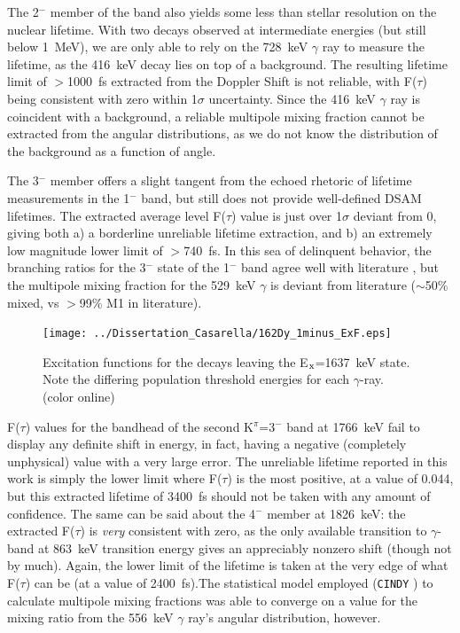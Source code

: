 The 2$^-$ member of the band also yields some less than stellar resolution on the nuclear lifetime. With two decays observed at intermediate energies (but still below 1~MeV), we are only able to rely on the 728~keV $\gamma$ ray to measure the lifetime, as the 416~keV decay lies on top of a background. The resulting lifetime limit of $>$1000~fs extracted from the Doppler Shift is not reliable, with F($\tau$) being consistent with zero within 1$\sigma$ uncertainty. Since the 416~keV $\gamma$ ray is coincident with a background, a reliable multipole mixing fraction cannot be extracted from the angular distributions, as we do not know the distribution of the background as a function of angle. 

The 3$^-$ member offers a slight tangent from the echoed rhetoric of lifetime measurements in the 1$^-$ band, but still does not provide well-defined DSAM lifetimes. The extracted average level F($\tau$) value is just over 1$\sigma$ deviant from 0, giving both a) a borderline unreliable lifetime extraction, and b) an extremely low magnitude lower limit of $>$740~fs. In this sea of delinquent behavior, the branching ratios for the 3$^-$ state of the 1$^-$ band agree well with literature \cite{Aprahamian200642}, but the multipole mixing fraction for the 529~keV $\gamma$ is deviant from literature ($\sim$50\% mixed, vs $>$99\% M1 in literature). %


\begin{figure}[h!]
\begin{center}
\texttt{[image: ../Dissertation\_Casarella/162Dy\_1minus\_ExF.eps]}
\end{center}
\caption{Excitation functions for the decays leaving the E$_{\rm x}$=1637~keV state. Note the differing population threshold energies for each $\gamma$-ray. (color online)\label{fig:162Dy_ExF1637}}
\end{figure}

F($\tau$) values for the bandhead of the second K$^\pi$=3$^-$ band at 1766~keV fail to display any definite shift in energy, in fact, having a negative (completely unphysical) value with a very large error. The unreliable lifetime reported in this work is simply the lower limit where F($\tau$) is the most positive, at a value of 0.044, but this extracted lifetime of 3400~fs should not be taken with any amount of confidence. The same can be said about the 4$^-$ member at 1826~keV: the extracted F($\tau$) is \textit{very} consistent with zero, as the only available transition to $\gamma$-band at 863~keV transition energy gives an appreciably nonzero shift (though not by much). Again, the lower limit of the lifetime is taken at the very edge of what F($\tau$) can be (at a value of 2400~fs).The statistical model employed ({\tt CINDY} \cite{SHELDON197399}) to calculate multipole mixing fractions was able to converge on a value for the mixing ratio from the 556~keV $\gamma$ ray's angular distribution, however.

